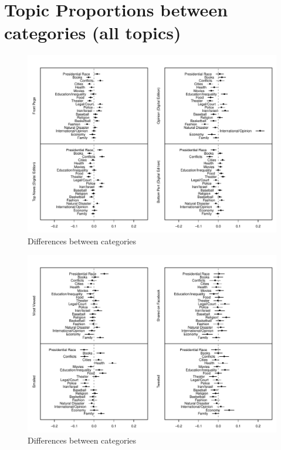 \documentclass[12pt]{article}
\begin{document}
\clearpage
\footnotesize\singlespacing
\appendices

\section{Topic Proportions between categories (all topics)}

\begin{figure}[h]
\caption{Differences between categories}\label{fig:res_nyt}
\includegraphics[width=\textwidth]{../calc/fig/res_nyt} 
\end{figure}

\begin{figure}[h]
\caption{Differences between categories}\label{fig:res_share}
\includegraphics[width=\textwidth]{../calc/fig/res_share} 
\end{figure}
\end{document}
